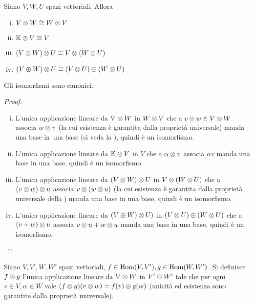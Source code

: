 \begin{proposition}
Siano $V\comma W\comma U$ spazi vettoriali. Allora
\begin{enumerate}[(i)]
\item $V\otimes W\cong W\otimes V$
\item $\mathbb{K}\otimes V\cong V$
\item $(V\otimes W)\otimes U\cong V\otimes(W\otimes U)$
\item $(V\oplus W)\otimes U\cong(V\otimes U)\oplus(W\otimes U)$
\end{enumerate}
Gli isomorfismi sono canonici.
\end{proposition}
\begin{proof}\leavevmode
\begin{enumerate}[(i)]
\item L'unica applicazione lineare da $V\otimes W$ in $W\otimes V$ che a $v\otimes w\in V\otimes W$ associa $w\otimes v$ (la cui esistenza è garantita dalla proprietà universale) manda una base in una base (si veda la ), quindi è un isomorfismo.
\item L'unica applicazione lineare da $\mathbb{K}\otimes V$ in $V$ che a $\alpha\otimes v$ associa $\alpha v$ manda una base in una base, quindi è un isomorfismo.
\item L'unica applicazione lineare da $(V\otimes W)\otimes U$ in $V\otimes(W\otimes U)$ che a $(v\otimes w)\otimes u$ associa $v\otimes(w\otimes u)$ (la cui esistenza è garantita dalla proprietà universale della ) manda una base in una base, quindi è un isomorfismo.
\item L'unica applicazione lineare da $(V\oplus W)\otimes U)$ in $(V\otimes U)\oplus(W\otimes U)$ che a $(v+w)\otimes u$ associa $v\otimes u+w\otimes u$ manda una base in una base, quindi è un isomorfismo.
\end{enumerate}
\end{proof}

\begin{definition}
Siano $V\comma V'\comma W\comma W'$ spazi vettoriali, $f\in\operatorname{Hom}(V,V'),\allowbreak g\in\operatorname{Hom}(W,W')$. Si definisce $f\otimes g$ l'unica applicazione lineare da $V\otimes W$ in $V'\otimes W'$ tale che per ogni $v\in V,w\in W$ vale $(f\otimes g)(v\otimes w)=f(v)\otimes g(w)$ (unicità ed esistenza sono garantite dalla proprietà universale).
\end{definition}

